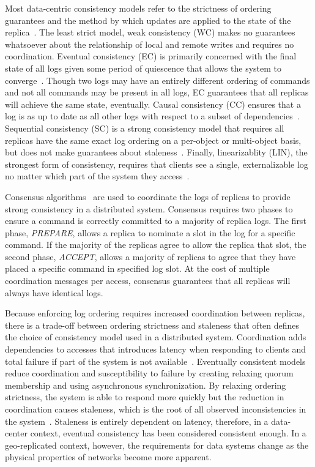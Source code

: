 Most data-centric consistency models refer to the strictness of ordering guarantees and the method by which updates are applied to the state of the replica~\cite{tanenbaum_distributed_2007}.
The least strict model, weak consistency (WC) makes no guarantees whatsoever about the relationship of local and remote writes and requires no coordination.
Eventual consistency (EC) is primarily concerned with the final state of all logs given some period of quiescence that allows the system to converge~\cite{anti_entropy}.
Though two logs may have an entirely different ordering of commands and not all commands may be present in all logs, EC guarantees that all replicas will achieve the same state, eventually.
Causal consistency (CC) ensures that a log is as up to date as all other logs with respect to a subset of dependencies~\cite{causal,causal_2}.
Sequential consistency (SC) is a strong consistency model that requires all replicas have the same exact log ordering on a per-object or multi-object basis, but does not make guarantees about staleness~\cite{sequential_consistency,sequential_consistency_2}.
Finally, linearizablity (LIN), the strongest form of consistency, requires that clients see a single, externalizable log no matter which part of the system they access~\cite{linearizability}.

Consensus algorithms~\cite{paxos,paxos_simple,paxos_practical,paxos_live,epaxos,fast_paxos,spaxos,multicoordinated_paxos,generalized_paxos,raft} are used to coordinate the logs of replicas to provide strong consistency in a distributed system.
Consensus requires two phases to ensure a command is correctly committed to a majority of replica logs.
The first phase, \emph{PREPARE}, allows a replica to nominate a slot in the log for a specific command.
If the majority of the replicas agree to allow the replica that slot, the second phase, \emph{ACCEPT}, allows a majority of replicas to agree that they have placed a specific command in specified log slot.
At the cost of multiple coordination messages per access, consensus guarantees that all replicas will always have identical logs.

Because enforcing log ordering requires increased coordination between replicas, there is a trade-off between ordering strictness and staleness that often defines the choice of consistency model used in a distributed system.
Coordination adds dependencies to accesses that introduces latency when responding to clients and total failure if part of the system is not available~\cite{fischer_impossibility_1985}.
Eventually consistent models reduce coordination and susceptibility to failure by creating relaxing quorum membership and using asynchronous synchronization.
By relaxing ordering strictness, the system is able to respond more quickly but the reduction in coordination causes staleness, which is the root of all observed inconsistencies in the system~\cite{probabilistically_bounded_staleness,quantifying_pbs}.
Staleness is entirely dependent on latency, therefore, in a data-center context, eventual consistency has been considered consistent enough.
In a geo-replicated context, however, the requirements for data systems change as the physical properties of networks become more apparent.

